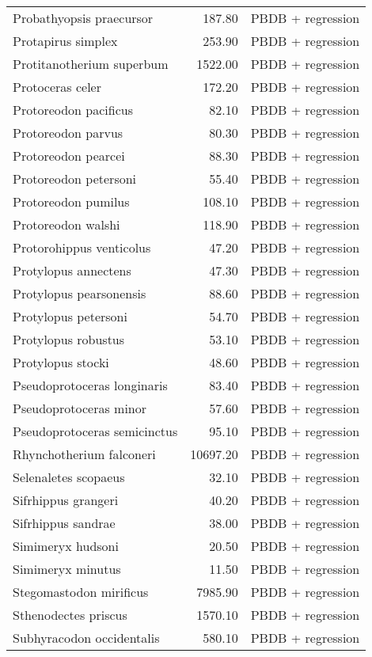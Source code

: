 \begin{table}[ht]
\begin{tabular}{lrl}
  Probathyopsis praecursor & 187.80 & PBDB + regression \\ 
  Protapirus simplex & 253.90 & PBDB + regression \\ 
  Protitanotherium superbum & 1522.00 & PBDB + regression \\ 
  Protoceras celer & 172.20 & PBDB + regression \\ 
  Protoreodon pacificus & 82.10 & PBDB + regression \\ 
  Protoreodon parvus & 80.30 & PBDB + regression \\ 
  Protoreodon pearcei & 88.30 & PBDB + regression \\ 
  Protoreodon petersoni & 55.40 & PBDB + regression \\ 
  Protoreodon pumilus & 108.10 & PBDB + regression \\ 
  Protoreodon walshi & 118.90 & PBDB + regression \\ 
  Protorohippus venticolus & 47.20 & PBDB + regression \\ 
  Protylopus annectens & 47.30 & PBDB + regression \\ 
  Protylopus pearsonensis & 88.60 & PBDB + regression \\ 
  Protylopus petersoni & 54.70 & PBDB + regression \\ 
  Protylopus robustus & 53.10 & PBDB + regression \\ 
  Protylopus stocki & 48.60 & PBDB + regression \\ 
  Pseudoprotoceras longinaris & 83.40 & PBDB + regression \\ 
  Pseudoprotoceras minor & 57.60 & PBDB + regression \\ 
  Pseudoprotoceras semicinctus & 95.10 & PBDB + regression \\ 
  Rhynchotherium falconeri & 10697.20 & PBDB + regression \\ 
  Selenaletes scopaeus & 32.10 & PBDB + regression \\ 
  Sifrhippus grangeri & 40.20 & PBDB + regression \\ 
  Sifrhippus sandrae & 38.00 & PBDB + regression \\ 
  Simimeryx hudsoni & 20.50 & PBDB + regression \\ 
  Simimeryx minutus & 11.50 & PBDB + regression \\ 
  Stegomastodon mirificus & 7985.90 & PBDB + regression \\ 
  Sthenodectes priscus & 1570.10 & PBDB + regression \\ 
  Subhyracodon occidentalis & 580.10 & PBDB + regression \\ 

\end{tabular}
\end{table}

